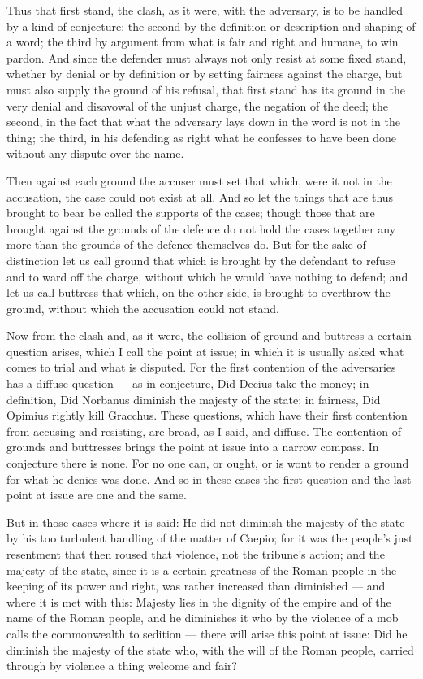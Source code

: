  Thus that first stand, the clash, as it were, with the adversary, is to be handled by a kind of conjecture; the second by the definition or description and shaping of a word; the third by argument from what is fair and right and humane, to win pardon. And since the defender must always not only resist at some fixed stand, whether by denial or by definition or by setting fairness against the charge, but must also supply the ground of his refusal, that first stand has its ground in the very denial and disavowal of the unjust charge, the negation of the deed; the second, in the fact that what the adversary lays down in the word is not in the thing; the third, in his defending as right what he confesses to have been done without any dispute over the name.

 Then against each ground the accuser must set that which, were it not in the accusation, the case could not exist at all. And so let the things that are thus brought to bear be called the supports of the cases; though those that are brought against the grounds of the defence do not hold the cases together any more than the grounds of the defence themselves do. But for the sake of distinction let us call ground that which is brought by the defendant to refuse and to ward off the charge, without which he would have nothing to defend; and let us call buttress that which, on the other side, is brought to overthrow the ground, without which the accusation could not stand.

 Now from the clash and, as it were, the collision of ground and buttress a certain question arises, which I call the point at issue; in which it is usually asked what comes to trial and what is disputed. For the first contention of the adversaries has a diffuse question — as in conjecture, Did Decius take the money; in definition, Did Norbanus diminish the majesty of the state; in fairness, Did Opimius rightly kill Gracchus. These questions, which have their first contention from accusing and resisting, are broad, as I said, and diffuse. The contention of grounds and buttresses brings the point at issue into a narrow compass. In conjecture there is none. For no one can, or ought, or is wont to render a ground for what he denies was done. And so in these cases the first question and the last point at issue are one and the same.

 But in those cases where it is said: He did not diminish the majesty of the state by his too turbulent handling of the matter of Caepio; for it was the people's just resentment that then roused that violence, not the tribune's action; and the majesty of the state, since it is a certain greatness of the Roman people in the keeping of its power and right, was rather increased than diminished — and where it is met with this: Majesty lies in the dignity of the empire and of the name of the Roman people, and he diminishes it who by the violence of a mob calls the commonwealth to sedition — there will arise this point at issue: Did he diminish the majesty of the state who, with the will of the Roman people, carried through by violence a thing welcome and fair?

